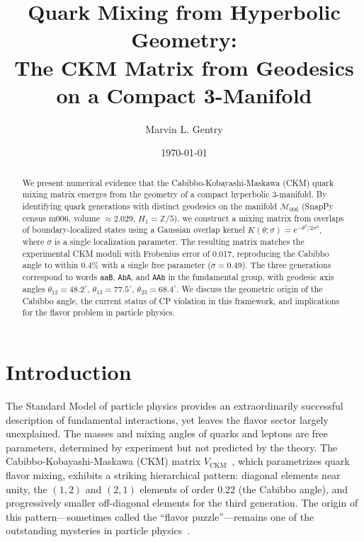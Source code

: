 \documentclass[11pt,a4paper]{article}
\newcommand{\CKM}{V_{\mathrm{CKM}}}
\newcommand{\Msix}{\mathcal{M}_{006}}
\begin{document}
\title{Quark Mixing from Hyperbolic Geometry:\\
The CKM Matrix from Geodesics on a Compact 3-Manifold}

\author[1]{Marvin L. Gentry}
\date{\today}


\begin{abstract}
We present numerical evidence that the Cabibbo-Kobayashi-Maskawa (CKM)
quark mixing matrix emerges from the geometry of a compact hyperbolic
3-manifold. By identifying quark generations with distinct geodesics
on the manifold $\Msix$ (SnapPy census m006, volume $\approx 2.029$,
$H_1 = \mathbb{Z}/5$), we construct a mixing matrix from overlaps of
boundary-localized states using a Gaussian overlap kernel
$K(\theta;\sigma) = e^{-\theta^2/2\sigma^2}$, where $\sigma$
is a single localization parameter. The resulting matrix matches the experimental
CKM moduli with Frobenius error of 0.017, reproducing the Cabibbo angle
to within 0.4\% with a single free parameter ($\sigma = 0.49$). The three
generations correspond to words \texttt{aaB}, \texttt{AbA}, and
\texttt{AAb} in the fundamental group, with geodesic axis angles
$\theta_{12} = 48.2^\circ$, $\theta_{13} = 77.5^\circ$,
$\theta_{23} = 68.4^\circ$. We discuss the geometric origin of the
Cabibbo angle, the current status of CP violation in this framework,
and implications for the flavor problem in particle physics.
\end{abstract}

\maketitle

\section{Introduction}
\label{sec:intro}

The Standard Model of particle physics provides an extraordinarily 
successful description of fundamental interactions, yet leaves the 
flavor sector largely unexplained. The masses and mixing angles of 
quarks and leptons are free parameters, determined by experiment but 
not predicted by the theory. The Cabibbo-Kobayashi-Maskawa (CKM) matrix 
$\CKM$~\cite{Cabibbo1963,KobayashiMaskawa1973}, which parametrizes 
quark flavor mixing, exhibits a striking hierarchical pattern: diagonal 
elements near unity, the $(1,2)$ and $(2,1)$ elements of order 0.22 
(the Cabibbo angle), and progressively smaller off-diagonal elements 
for the third generation. The origin of this pattern---sometimes called 
the ``flavor puzzle''---remains one of the outstanding mysteries in 
particle physics~\cite{Feruglio2015}.
\end{document}
